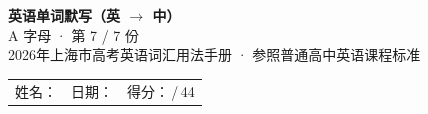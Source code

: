 \documentclass[10pt,a4paper]{article}
\begin{document}
\pagestyle{plain}

\begin{center}
{\LARGE\bfseries 英语单词默写（英 $\to$ 中）}\\[0.22em]
{\large A 字母 · 第 7 / 7 份}\\[0.18em]
{\small 2026年上海市高考英语词汇用法手册 · 参照普通高中英语课程标准}
\end{center}

\vspace{0.25em}
\noindent\begin{tabular}{@{}p{}@{}p{}@{}p{}@{}}
姓名：\underline{\hspace{2.0cm}} & 日期：\underline{\hspace{2.0cm}} & 得分：\underline{\hspace{1.3cm}}\,/\,44 \\
\end{tabular}

\vspace{0.3em}

\vspace{0.08em}
\end{document}
